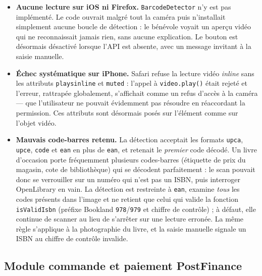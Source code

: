 \documentclass[12pt, a4paper]{report}
\renewcommand{\_}{\origunderscore\allowbreak}
\begin{document}
\begin{itemize}
  \item \textbf{Aucune lecture sur iOS ni Firefox.} \texttt{BarcodeDetector} n'y est pas implémenté. Le code ouvrait malgré tout la caméra puis n'installait simplement aucune boucle de détection : le bénévole voyait un aperçu vidéo qui ne reconnaissait jamais rien, sans aucune explication. Le bouton est désormais désactivé lorsque l'API est absente, avec un message invitant à la saisie manuelle.
  \item \textbf{Échec systématique sur iPhone.} Safari refuse la lecture vidéo \emph{inline} sans les attributs \texttt{playsinline} et \texttt{muted} : l'appel à \texttt{video.play()} était rejeté et l'erreur, rattrapée globalement, s'affichait comme un refus d'accès à la caméra — que l'utilisateur ne pouvait évidemment pas résoudre en réaccordant la permission. Ces attributs sont désormais posés sur l'élément comme sur l'objet vidéo.
  \item \textbf{Mauvais code-barres retenu.} La détection acceptait les formats \texttt{upc\_a}, \texttt{upc\_e}, \texttt{code\_128} et \texttt{ean\_8} en plus de \texttt{ean\_13}, et retenait le \emph{premier} code décodé. Un livre d'occasion porte fréquemment plusieurs codes-barres (étiquette de prix du magasin, cote de bibliothèque) qui se décodent parfaitement : le scan pouvait donc se verrouiller sur un numéro qui n'est pas un ISBN, puis interroger OpenLibrary en vain. La détection est restreinte à \texttt{ean\_13}, examine \emph{tous} les codes présents dans l'image et ne retient que celui qui valide la fonction \texttt{isValidIsbn} (préfixe Bookland \texttt{978}/\texttt{979} et chiffre de contrôle) ; à défaut, elle continue de scanner au lieu de s'arrêter sur une lecture erronée. La même règle s'applique à la photographie du livre, et la saisie manuelle signale un ISBN au chiffre de contrôle invalide.
\end{itemize}

\subsection{Module commande et paiement PostFinance}
\label{sec:module-commande-paiement}
\end{document}
